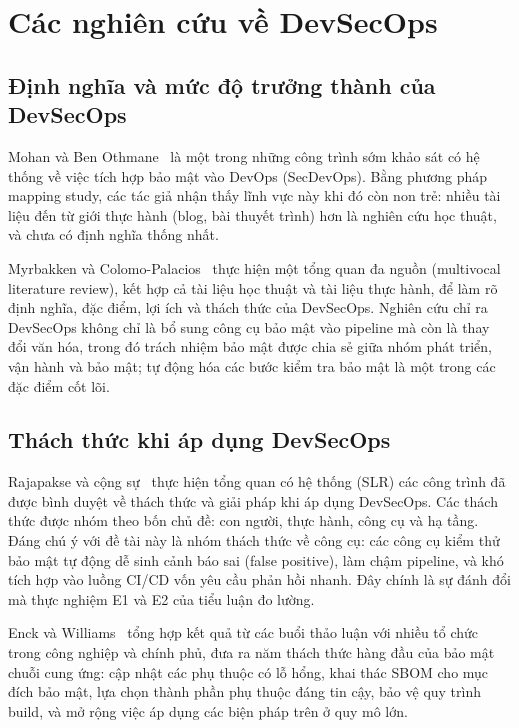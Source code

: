 \documentclass[12pt,a4paper,oneside]{extreport}
\begin{document}
\section{Các nghiên cứu về DevSecOps}
\label{sec:devsecops-research}
\subsection{Định nghĩa và mức độ trưởng thành của DevSecOps}
Mohan và Ben Othmane~\cite{mohan2016} là một trong những công trình sớm khảo sát
có hệ thống về việc tích hợp bảo mật vào DevOps (SecDevOps). Bằng phương pháp
mapping study, các tác giả nhận thấy lĩnh vực này khi đó còn non trẻ: nhiều tài
liệu đến từ giới thực hành (blog, bài thuyết trình) hơn là nghiên cứu học
thuật, và chưa có định nghĩa thống nhất.

Myrbakken và Colomo-Palacios~\cite{myrbakken2017} thực hiện một tổng quan đa
nguồn (multivocal literature review), kết hợp cả tài liệu học thuật và tài liệu
thực hành, để làm rõ định nghĩa, đặc điểm, lợi ích và thách thức của DevSecOps.
Nghiên cứu chỉ ra DevSecOps không chỉ là bổ sung công cụ bảo mật vào pipeline
mà còn là thay đổi văn hóa, trong đó trách nhiệm bảo mật được chia sẻ giữa
nhóm phát triển, vận hành và bảo mật; tự động hóa các bước kiểm tra bảo mật là
một trong các đặc điểm cốt lõi.

\subsection{Thách thức khi áp dụng DevSecOps}
Rajapakse và cộng sự~\cite{rajapakse2022} thực hiện tổng quan có hệ thống (SLR)
các công trình đã được bình duyệt về thách thức và giải pháp khi áp dụng
DevSecOps. Các thách thức được nhóm theo bốn chủ đề: con người, thực hành, công
cụ và hạ tầng. Đáng chú ý với đề tài này là nhóm thách thức về công cụ: các
công cụ kiểm thử bảo mật tự động dễ sinh cảnh báo sai (false positive), làm
chậm pipeline, và khó tích hợp vào luồng CI/CD vốn yêu cầu phản hồi nhanh. Đây
chính là sự đánh đổi mà thực nghiệm E1 và E2 của tiểu luận đo lường.

Enck và Williams~\cite{enck2022} tổng hợp kết quả từ các buổi thảo luận với
nhiều tổ chức trong công nghiệp và chính phủ, đưa ra năm thách thức hàng đầu
của bảo mật chuỗi cung ứng: cập nhật các phụ thuộc có lỗ hổng, khai thác SBOM
cho mục đích bảo mật, lựa chọn thành phần phụ thuộc đáng tin cậy, bảo vệ quy
trình build, và mở rộng việc áp dụng các biện pháp trên ở quy mô lớn.
\end{document}
